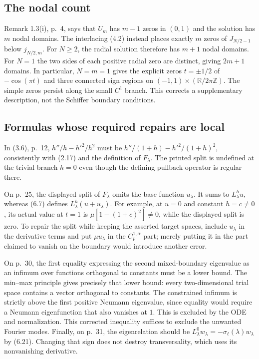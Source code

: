 \documentclass[10pt]{article}
\begin{document}
\subsection*{The nodal count}
Remark 1.3(i), p. 4, says that \(U_m\) has \(m-1\) zeros in \((0,1)\) and the solution has \(m\) nodal domains. The interlacing (4.2) instead places exactly \(m\) zeros of \(J_{N/2-1}\) below \(j_{N/2,m}\). For \(N\ge2\), the radial solution therefore has \(m+1\) nodal domains. For \(N=1\) the two sides of each positive radial zero are distinct, giving \(2m+1\) domains. In particular, \(N=m=1\) gives the explicit zeros \(t=\pm1/2\) of \(-\cos(\pi t)\) and three connected sign regions on \((-1,1)\times(\mathbb R/2\pi\mathbb Z)\). The simple zeros persist along the small \(C^1\) branch. This corrects a supplementary description, not the Schiffer boundary conditions.\par
\subsection*{Formulas whose required repairs are local}
In (3.6), p. 12, \(h''/h-h'^2/h^2\) must be \(h''/(1+h)-h'^2/(1+h)^2\), consistently with (2.17) and the definition of \(F_\lambda\). The printed split is undefined at the trivial branch \(h=0\) even though the defining pullback operator is regular there.\par
On p. 25, the displayed split of \(F_\lambda\) omits the base function \(u_\lambda\). It sums to \(L_\lambda^hu\), whereas (6.7) defines \(L_\lambda^h(u+u_\lambda)\). For example, at \(u=0\) and constant \(h=c\ne0\), its actual value at \(t=1\) is \(\mu[1-(1+c)^2]\ne0\), while the displayed split is zero. To repair the split while keeping the asserted target spaces, include \(u_\lambda\) in the derivative terms and put \(\mu u_\lambda\) in the \(C_p^{1,\alpha}\) part; merely putting it in the part claimed to vanish on the boundary would introduce another error.\par
On p. 30, the first equality expressing the second mixed-boundary eigenvalue as an infimum over functions orthogonal to constants must be a lower bound. The min–max principle gives precisely that lower bound: every two-dimensional trial space contains a vector orthogonal to constants. The constrained infimum is strictly above the first positive Neumann eigenvalue, since equality would require a Neumann eigenfunction that also vanishes at \(1\). This is excluded by the ODE and normalization. This corrected inequality suffices to exclude the unwanted Fourier modes. Finally, on p. 31, the eigenrelation should be \(L_\lambda^0w_\lambda=-\sigma_\ell(\lambda)w_\lambda\) by (6.21). Changing that sign does not destroy transversality, which uses its nonvanishing derivative.\par
\end{document}
